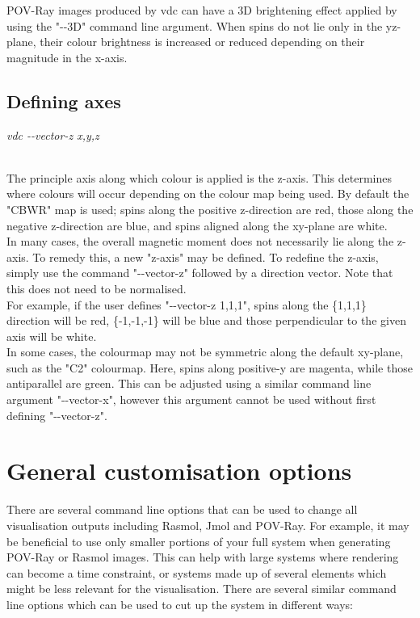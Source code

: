 POV-Ray images produced by vdc can have a 3D brightening effect applied by using the "-{}-3D" command line argument. When spins do not lie only in the yz-plane, their colour brightness is increased or reduced depending on their magnitude in the x-axis. \\

\subsection*{Defining axes}

\begin{minipage}[c]{\textwidth}
\centering
\textit{vdc -{}-vector-z x,y,z}
\end{minipage}\\

The principle axis along which colour is applied is the z-axis. This determines where colours will occur depending on the colour map being used. By default the "CBWR" map is used; spins along the positive z-direction are red, those along the negative z-direction are blue, and spins aligned along the xy-plane are white.\\

In many cases, the overall magnetic moment does not necessarily lie along the z-axis. To remedy this, a new "z-axis" may be defined. To redefine the z-axis, simply use the command "-{}-vector-z" followed by a direction vector. Note that this does not need to be normalised.\\

For example, if the user defines "-{}-vector-z 1,1,1", spins along the \{1,1,1\} direction will be red, \{-1,-1,-1\} will be blue and those perpendicular to the given axis will be white.\\

In some cases, the colourmap may not be symmetric along the default xy-plane, such as the "C2" colourmap. Here, spins along positive-y are magenta, while those antiparallel are green. This can be adjusted using a similar command line argument "-{}-vector-x", however this argument cannot be used without first defining "-{}-vector-z". \\

\section*{General customisation options}

There are several command line options that can be used to change all visualisation outputs including Rasmol, Jmol and POV-Ray. For example, it may be beneficial to use only smaller portions of your full system when generating POV-Ray or Rasmol images. This can help with large systems where rendering can become a time constraint, or systems made up of several elements which might be less relevant for the visualisation. There are several similar command line options which can be used to cut up the system in different ways:

